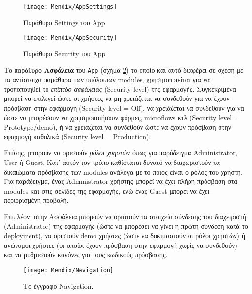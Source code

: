             \begin{figure}[h!] \noindent \centering
                \texttt{[image: Mendix/AppSettings]}
                \caption{\centering Παράθυρο Settings του App}
                \label{fig:MendixAppSettings}
            \end{figure}

            \begin{figure}[h!] \noindent \centering
                \texttt{[image: Mendix/AppSecurity]}
                \caption{\centering Παράθυρο Security του App}
                \label{fig:MendixAppSecurity}
            \end{figure}

            Το παράθυρο \textbf{Ασφάλεια} του \texttt{App} (σχήμα \ref{fig:MendixAppSecurity}) το οποίο και αυτό διαφέρει σε σχέση με τα αντίστοιχα παράθυρα των υπόλοιπων modules, χρησιμοποιείται για να τροποποιηθεί το \textit{επίπεδο ασφάλειας} (Security level) της εφαρμογής. Συγκεκριμένα μπορεί να επιλεγεί ώστε οι χρήστες να μη χρειάζεται να συνδεθούν για να έχουν πρόσβαση στην εφαρμογή (Security level = Off), να χρειάζεται να συνδεθούν για να ώστε να μπορέσουν να χρησιμοποιήσουν φόρμες, microflows κτλ (Security level = Prototype/demo), ή να χρειάζεται να συνδεθούν ώστε να έχουν πρόσβαση στην εφαρμογή καθολικά (Security level = Production).

            Επίσης, μπορούν να οριστούν \textit{ρόλοι χρηστών} όπως για παράδειγμα Administrator, User ή Guest. Κατ' αυτόν τον τρόπο καθίσταται δυνατό να διαχωριστούν τα δικαιώματα πρόσβασης των modules ανάλογα με το ποιος είναι ο ρόλος του χρήστη. Για παράδειγμα, ένας Administrator χρήστης μπορεί να έχει πλήρη πρόσβαση στα modules και στις σελίδες της εφαρμογής, ενώ ένας Guest μπορεί να έχει περιορισμένη προβολή.

            Επιπλέον, στην Ασφάλεια μπορούν να οριστούν τα στοιχεία σύνδεσης του διαχειριστή (Administrator) της εφαρμογής (ώστε να μπορέσει να γίνει η πρώτη σύνδεση κατά το deployment), να οριστούν demo χρήστες (ώστε να δοκιμαστούν οι ρόλοι χρηστών) ή ανώνυμοι χρήστες (οι οποίοι έχουν πρόσβαση στην εφαρμογή χωρίς να συνδεθούν) και να ρυθμιστούν κανόνες για τους κωδικούς πρόσβασης.

            \begin{figure}[h!] \noindent \centering
                \texttt{[image: Mendix/Navigation]}
                \caption{\centering Το έγγραφο Navigation.}
                \label{fig:MendixAppNavigation}
            \end{figure}

